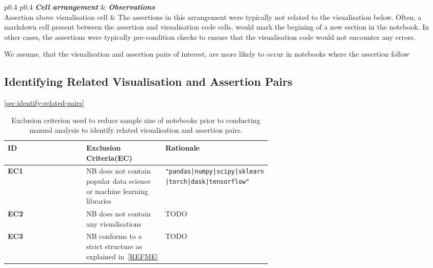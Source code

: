\documentclass[acmsmall,screen,review,anonymous]{acmart}
\begin{document}
\begin{table}
  \centering
  \caption{Observations from random samples of notebooks with various
  cell arrangement.}
  \begin{tabular}{p{0.4\textwidth} p{0.4\textwidth}}
    \toprule
    \emph{\textbf{Cell arrangement}} &
    \emph{\textbf{Observations}}\\
    \midrule
    Assertion above visualisation cell &
    The assertions in this arrangement were typically not related to
    the visualisation below. Often, a markdown cell present between
    the assertion and visualisation code cells, would mark the
    begining of a new section in the notebook. In other cases, the
    assertions were typically pre-condition checks to ensure that the
    visualisation code would not encounter any errors.\\
    \bottomrule
  \end{tabular}
  \label{tab:cell-arrangement}
\end{table}

We assume, that the visualisation and assertion pairs of interest, are
more likely to occur in notebooks where the assertion follow

\subsection{Identifying Related Visualisation and Assertion
Pairs}\ref{sec:identify-related-pairs}

\begin{table}
  \centering
  \caption{Exclusion criterion used to reduce sample size of notebooks
    prior to conducting manual analysis to identify related
    visualisation and assertion pairs.}
  \begin{tabular}{l p{0.3\linewidth} p{0.3\linewidth}}
    \toprule
    \textbf{ID} &
    \textbf{Exclusion Criteria(EC)} &
    \textbf{Rationale}\\
    \midrule
    \textbf{EC1} &
    NB does not contain popular data science or machine
    learning libraries &
    \texttt{"pandas|numpy|scipy|sklearn |torch|dask|tensorflow"}\\
    \textbf{EC2} &
    NB does not contain any visualisations &
    TODO\\
    \textbf{EC3} &
    NB conforms to a strict structure as explained in~\ref{REFME} &
    TODO\\
    \bottomrule
  \end{tabular}
  \label{tab:pre-exclusion-criteria}
\end{table}
\end{document}

